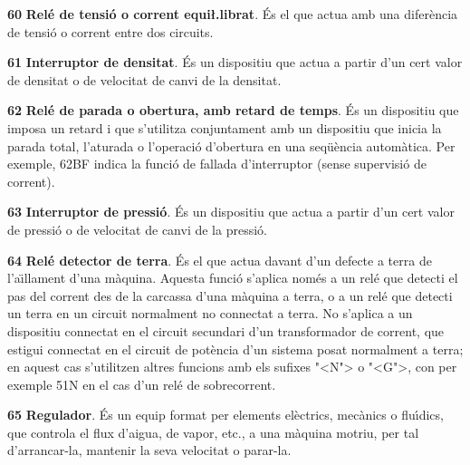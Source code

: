 \begin{multicols}{2}
\begin{list}{}
\item[\textbf{60}]   
\textbf{Rel\'{e} de tensi\'{o} o corrent equi{\l.l}ibrat}. \'{E}s el que actua amb una difer\`{e}ncia de tensi\'{o} o
corrent entre dos circuits.

\item[\textbf{61}] 
 \textbf{Interruptor de densitat}. \'{E}s un dispositiu que actua a partir d'un cert valor de densitat o de velocitat de canvi de la densitat.


\item[\textbf{62}]   
\textbf{Rel\'{e} de
parada o obertura, amb retard de temps}. \'{E}s un dispositiu que imposa un retard i que s'utilitza
conjuntament amb un dispositiu que inicia la parada total, l'aturada o l'operaci\'{o}
d'obertura en una seq\"{u}\`{e}ncia autom\`{a}tica. Per exemple, 62BF indica la funci\'{o} de fallada d'interruptor (sense supervisi\'{o} de corrent).

\item[\textbf{63}]   
\textbf{Interruptor de pressi\'{o}}. \'{E}s un dispositiu que actua a partir d'un cert valor de pressi\'{o} o de velocitat de canvi de la pressi\'{o}.

\item[\textbf{64}]    
\textbf{Rel\'{e} detector de terra}.
\'{E}s el que actua davant d'un defecte a terra de l'a\"{\i}llament d'una
m\`{a}quina. Aquesta funci\'{o} s'aplica nom\'{e}s a un rel\'{e} que detecti el pas
del corrent des de la carcassa  d'una m\`{a}quina a terra, o a un rel\'{e}
que detecti un terra en un circuit normalment no connectat a terra. No
 s'aplica a un dispositiu connectat en el circuit secundari d'un
transformador de corrent, que estigui connectat en el circuit de
pot\`{e}ncia d'un sistema posat normalment a terra; en aquest cas s'utilitzen altres funcions amb els sufixes {"<}N{">} o {"<}G{">}, con  per exemple 51N en el cas d'un rel\'{e} de sobrecorrent.

\item[\textbf{65}]   
\textbf{Regulador}. \'{E}s un equip format per elements
el\`{e}ctrics, mec\`{a}nics o flu\'{\i}dics,  que controla el flux d'aigua, de
vapor, etc.,  a una m\`{a}quina motriu, per tal d'arrancar-la, mantenir
la seva velocitat o parar-la.


\end{list}
\end{multicols}

